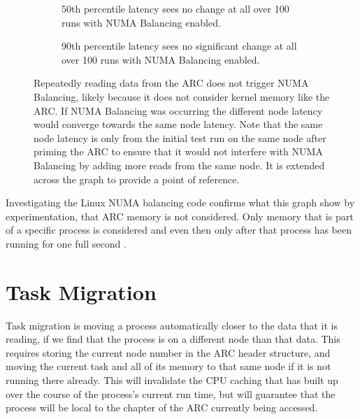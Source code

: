 \begin{figure}[H]
    \centering
    \begin{subfigure}{0.4\linewidth}
        \resizebox{0.9\linewidth}{!}{}
        \captionsetup{width=0.9\textwidth}
        \caption{50th percentile latency sees no change at all over 100 runs with NUMA Balancing enabled.}
    \end{subfigure}
    \begin{subfigure}{0.4\linewidth}
        \resizebox{0.9\linewidth}{!}{}
        \captionsetup{width=0.9\textwidth}
        \caption{90th percentile latency sees no significant change at all over 100 runs with NUMA Balancing enabled.}
    \end{subfigure}
    \captionsetup{width=0.80\linewidth}
    \caption{Repeatedly reading data from the ARC does not trigger NUMA Balancing, likely because it does not consider kernel memory like the ARC.
    If NUMA Balancing was occurring the different node latency would converge towards the same
    node latency. Note that the same node latency is only from the initial test run on the same node
    after priming the ARC to ensure that it would not interfere with NUMA Balancing by adding more
    reads from the same node. It is extended across the graph to provide a point of reference.}
    \label{fig:100NUMABalance}
\end{figure}

Investigating the Linux NUMA balancing code confirms what this graph show by experimentation, that ARC memory is not considered.
Only memory that is part of a specific process is considered and even then only after that process has been running for one full second
\cite[{kernel/sched/fair.c}]{linux}.

\chapter{Task Migration}
Task migration is moving a process automatically closer to the data that it is reading, if we find that the process is on a different node than that data.
This requires storing the current node number in the ARC header structure, 
and moving the current task and all of its memory to that same node if it is not running there already.
This will invalidate the CPU caching that has built up over the course of the process's current run time,
but will guarantee that the process will be local to the chapter of the ARC currently being accessed.

